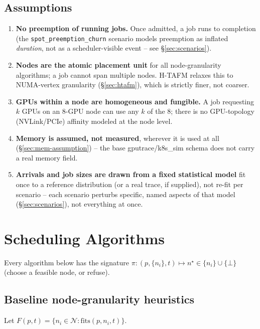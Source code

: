 \documentclass[11pt]{article}
\newcommand{\N}{\mathcal{N}}
\begin{document}
\subsection{Assumptions}
\begin{enumerate}[leftmargin=1.4em]
  \item \textbf{No preemption of running jobs.} Once admitted, a job runs
    to completion (the \texttt{spot\_preemption\_churn} scenario models
    preemption as inflated \emph{duration}, not as a scheduler-visible
    event -- see \S\ref{sec:scenarios}).
  \item \textbf{Nodes are the atomic placement unit} for all
    node-granularity algorithms; a job cannot span multiple nodes.
    H-TAFM relaxes this to NUMA-vertex granularity (\S\ref{sec:htafm}),
    which is strictly finer, not coarser.
  \item \textbf{GPUs within a node are homogeneous and fungible.} A job
    requesting $k$ GPUs on an 8-GPU node can use any $k$ of the 8; there is
    no GPU-topology (NVLink/PCIe) affinity modeled at the node level.
  \item \textbf{Memory is assumed, not measured}, wherever it is used at
    all (\S\ref{sec:mem-assumption}) -- the base gputrace/k8s\_sim schema
    does not carry a real memory field.
  \item \textbf{Arrivals and job sizes are drawn from a fixed statistical
    model} fit once to a reference distribution (or a real trace, if
    supplied), not re-fit per scenario -- each scenario perturbs specific,
    named aspects of that model (\S\ref{sec:scenarios}), not everything at
    once.
\end{enumerate}

\section{Scheduling Algorithms}

Every algorithm below has the signature $\pi : (p, \{n_i\}, t) \mapsto
n^\star \in \{n_i\} \cup \{\bot\}$ (choose a feasible node, or refuse).

\subsection{Baseline node-granularity heuristics}
Let $F(p,t) = \{n_i \in \N : \mathrm{fits}(p, n_i, t)\}$.
\end{document}
